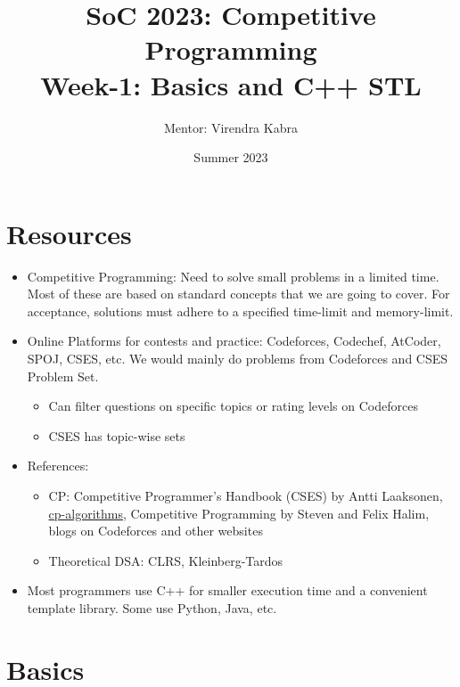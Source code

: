 \documentclass{article}
\title{\textbf{SoC 2023: Competitive Programming \\ {\Large Week-1: Basics and C++ STL}}}
\author{Mentor: Virendra Kabra}
\date{Summer 2023}
\begin{document}
\begin{sloppypar}       %

    \maketitle
    \tableofcontents
    \thispagestyle{empty}

    \newpage

    \section{Resources}
    \begin{itemize}
        \item Competitive Programming: Need to solve small problems in a limited time. Most of these are based on standard concepts that we are going to cover. For acceptance, solutions must adhere to a specified time-limit and memory-limit.
        \item Online Platforms for contests and practice: Codeforces, Codechef, AtCoder, SPOJ, CSES, etc. We would mainly do problems from Codeforces and CSES Problem Set.
        \begin{itemize}
            \item Can filter questions on specific topics or rating levels on Codeforces
            \item CSES has topic-wise sets
        \end{itemize}
        \item References:
        \begin{itemize}
            \item CP: Competitive Programmer's Handbook (CSES) by Antti Laaksonen, \href{https://cp-algorithms.com/}{cp-algorithms}, Competitive Programming by Steven and Felix Halim, blogs on Codeforces and other websites
            \item Theoretical DSA: CLRS, Kleinberg-Tardos
        \end{itemize}
        \item Most programmers use C++ for smaller execution time and a convenient template library. Some use Python, Java, etc.
    \end{itemize}

    \newpage

    \section{Basics}


\end{sloppypar}
\end{document}
